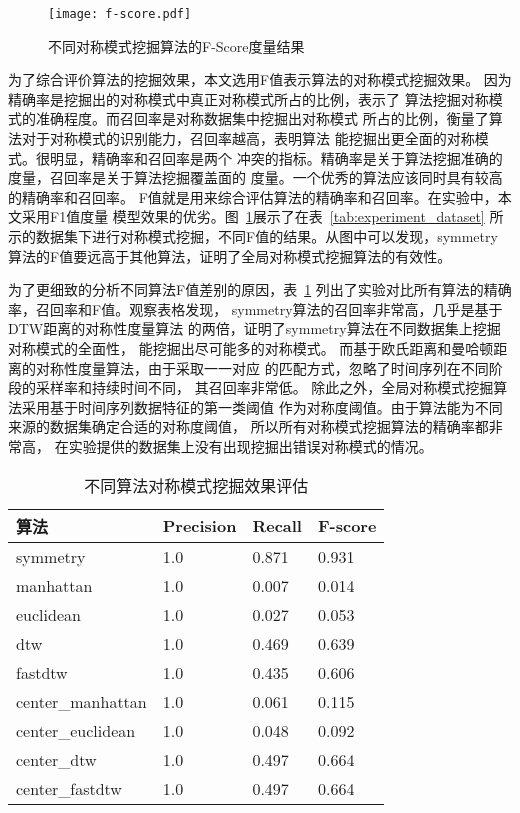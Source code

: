 \begin{figure}
  \centering
  \texttt{[image: f-score.pdf]}
  \caption{不同对称模式挖掘算法的F-Score度量结果}
  \label{fig:fscore_compare}
\end{figure}

为了综合评价算法的挖掘效果，本文选用F值表示算法的对称模式挖掘效果。
因为精确率是挖掘出的对称模式中真正对称模式所占的比例，表示了
算法挖掘对称模式的准确程度。而召回率是对称数据集中挖掘出对称模式
所占的比例，衡量了算法对于对称模式的识别能力，召回率越高，表明算法
能挖掘出更全面的对称模式。很明显，精确率和召回率是两个
冲突的指标。精确率是关于算法挖掘准确的度量，召回率是关于算法挖掘覆盖面的
度量。一个优秀的算法应该同时具有较高的精确率和召回率。
F值就是用来综合评估算法的精确率和召回率。在实验中，本文采用F1值度量
模型效果的优劣。图~\ref{fig:fscore_compare}展示了在表~\ref{tab:experiment_dataset}
所示的数据集下进行对称模式挖掘，不同F值的结果。从图中可以发现，symmetry
算法的F值要远高于其他算法，证明了全局对称模式挖掘算法的有效性。

为了更细致的分析不同算法F值差别的原因，表~\ref{tab:experiment_global_algo}
列出了实验对比所有算法的精确率，召回率和F值。观察表格发现，
symmetry算法的召回率非常高，几乎是基于DTW距离的对称性度量算法
的两倍，证明了symmetry算法在不同数据集上挖掘对称模式的全面性，
能挖掘出尽可能多的对称模式。
而基于欧氏距离和曼哈顿距离的对称性度量算法，由于采取一一对应
的匹配方式，忽略了时间序列在不同阶段的采样率和持续时间不同，
其召回率非常低。
除此之外，全局对称模式挖掘算法采用基于时间序列数据特征的第一类阈值
作为对称度阈值。由于算法能为不同来源的数据集确定合适的对称度阈值，
所以所有对称模式挖掘算法的精确率都非常高，
在实验提供的数据集上没有出现挖掘出错误对称模式的情况。


\begin{table}
  \centering
  \caption{不同算法对称模式挖掘效果评估}
  \begin{tabular}{llll}
    \toprule
    算法          & Precision   & Recall & F-score                        \\
    \midrule
    symmetry          & 1.0   & 0.871 & 0.931   \\
    manhattan         & 1.0  & 0.007 & 0.014 \\
    euclidean         & 1.0  & 0.027 & 0.053 \\
    dtw               & 1.0  & 0.469 & 0.639  \\
    fastdtw           & 1.0  & 0.435 & 0.606 \\
    center\_manhattan & 1.0  & 0.061 & 0.115 \\
    center\_euclidean & 1.0  & 0.048 & 0.092  \\
    center\_dtw       & 1.0  & 0.497 & 0.664  \\
    center\_fastdtw   & 1.0  & 0.497 & 0.664 \\
    \bottomrule
  \end{tabular}
  \label{tab:experiment_global_algo}
\end{table}


